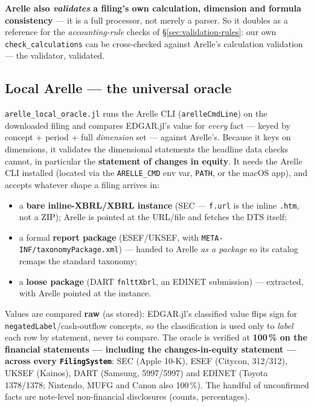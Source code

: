 \documentclass[11pt,a4paper]{report}
\begin{document}
\medskip\noindent \textbf{Arelle also \emph{validates} a filing's own calculation, dimension and formula
consistency} --- it is a full processor, not merely a parser. So it doubles as a reference for the
\emph{accounting-rule} checks of \S\ref{sec:validation-rules}: our own \texttt{check\_calculations} can be
cross-checked against Arelle's calculation validation --- the validator, validated.

\subsection{Local Arelle --- the universal oracle}

\texttt{arelle\_local\_oracle.jl} runs the Arelle CLI (\texttt{arelleCmdLine}) on the downloaded filing and
compares EDGAR.jl's value for \emph{every} fact --- keyed by concept + period + full \emph{dimension} set
--- against Arelle's. Because it keys on dimensions, it validates the dimensional statements the headline
data checks cannot, in particular the \textbf{statement of changes in equity}. It needs the Arelle CLI
installed (located via the \texttt{ARELLE\_CMD} env var, \texttt{PATH}, or the macOS app), and accepts
whatever shape a filing arrives in:

\begin{itemize}[nosep]
  \item a \textbf{bare inline-XBRL/XBRL instance} (SEC --- \texttt{f.url} is the inline \texttt{.htm}, not a
    ZIP); Arelle is pointed at the URL/file and fetches the DTS itself;
  \item a formal \textbf{report package} (ESEF/UKSEF, with \texttt{META-INF/taxonomyPackage.xml}) --- handed
    to Arelle \emph{as a package} so its catalog remaps the standard taxonomy;
  \item a \textbf{loose package} (DART \texttt{fnlttXbrl}, an EDINET submission) --- extracted, with Arelle
    pointed at the instance.
\end{itemize}

\noindent Values are compared \textbf{raw} (as stored): EDGAR.jl's classified value flips sign for
\texttt{negatedLabel}/cash-outflow concepts, so the classification is used only to \emph{label} each row by
statement, never to compare. The oracle is verified at \textbf{100\,\% on the financial statements ---
including the changes-in-equity statement --- across every \texttt{FilingSystem}}: SEC (Apple 10-K), ESEF
(Citycon, 312/312), UKSEF (Kainos), DART (Samsung, 5997/5997) and EDINET (Toyota 1378/1378; Nintendo, MUFG
and Canon also 100\,\%). The handful of unconfirmed facts are note-level non-financial disclosures (counts,
percentages).
\end{document}
